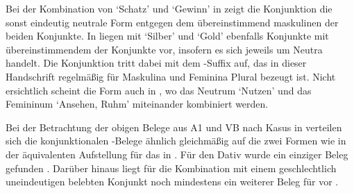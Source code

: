 Bei der Kombination von  `Schatz' und  `Gewinn' in
 zeigt die Konjunktion die sonst eindeutig neutrale
Form entgegen dem übereinstimmend maskulinen  der beiden Konjunkte.
In  liegen mit  `Silber' und 
`Gold' ebenfalls Konjunkte mit übereinstimmendem  der Konjunkte vor,
insofern es sich jeweils um Neutra handelt. Die Konjunktion tritt dabei mit dem
-Suffix auf, das in dieser Handschrift regelmäßig für Maskulina und
Feminina Plural bezeugt ist. Nicht ersichtlich scheint die Form 
auch in , wo das Neutrum  `Nutzen' und
das Femininum  `Ansehen, Ruhm' miteinander kombiniert werden.

Bei der Betrachtung der obigen Belege aus A1 und VB nach
Kasus in  verteilen sich die konjunktionalen
-Belege ähnlich gleichmäßig auf die zwei Formen wie in der
äquivalenten Aufstellung für das \CAO{} in .
Für den Dativ wurde ein einziger Beleg gefunden . Darüber
hinaus liegt für die Kombination mit einem geschlechtlich
uneindeutigen belebten Konjunkt noch mindestens ein
weiterer Beleg für  vor .

